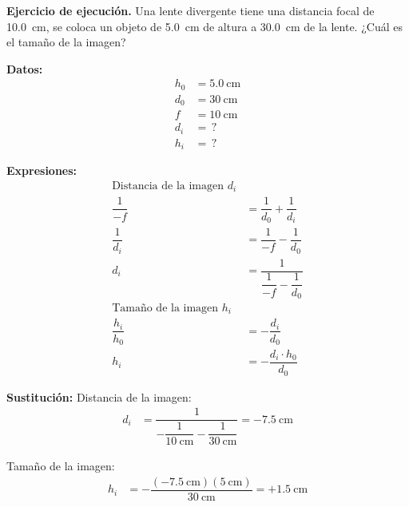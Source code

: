 \documentclass[12pt]{exam}
\begin{document}
\begin{questions}
    \setcounter{question}{17} \question \textbf{Ejercicio de ejecución.} Una lente divergente tiene una distancia focal de \SI{10.0}{\centi\meter}, se coloca un objeto de \SI{5.0}{\centi\meter} de altura a \SI{30.0}{\centi\meter} de la lente. ¿Cuál es el tamaño de la imagen?

    \vspace{0.3cm}
    \begin{minipage}[t]{0.35\linewidth}
    \textbf{Datos:}
    \begin{align*}
    h_{0} &= \SI{5.0}{\centi\meter} \\
    d_{0} &= \SI{30}{\centi\meter} \\
    f &= \SI{10}{\centi\meter} \\
    d_{i} &= \, ? \\
    h_{i} &= \, ?
    \end{align*}
    \end{minipage}
    \hspace{1cm}
    \begin{minipage}[t]{0.4\linewidth}
    \textbf{Expresiones:}
    \begin{align*}
    \text{Distancia de la imagen } d_{i} \\[0.3em]
    \dfrac{1}{-f} &= \dfrac{1}{d_{0}} + \dfrac{1}{d_{i}} \\[0.3em]
    \dfrac{1}{d_{i}} &= \dfrac{1}{-f} - \dfrac{1}{d_{0}} \\[0.4em]
    d_{i} &= \dfrac{1}{\dfrac{1}{-f} - \dfrac{1}{d_{0}}} \\[0.5em]
    \text{Tamaño de la imagen } h_{i} \\[0.3em]
    \dfrac{h_{i}}{h_{0}} &= - \dfrac{d_{i}}{d_{0}} \\[0.5em]
    h_{i} &= - \dfrac{d_{i} \cdot h_{0}}{d_{0}} 
    \end{align*}
    \end{minipage}

    \vspace{0.3cm}
    \textbf{Sustitución:}
    Distancia de la imagen:
    \begin{align*}
    d_{i} &= \dfrac{1}{- \dfrac{1}{\SI{10}{\centi\meter}} - \dfrac{1}{\SI{30}{\centi\meter}}} = \SI{-7.5}{\centi\meter}
    \end{align*}

    \vspace{0.3cm}
    Tamaño de la imagen:
    \begin{align*}
    h_{i} &= - \dfrac{(\SI{-7.5}{\centi\meter})(\SI{5}{\centi\meter})}{\SI{30}{\centi\meter}} = +\SI{1.5}{\centi\meter}
    \end{align*}
    

\end{questions}
\end{document}
